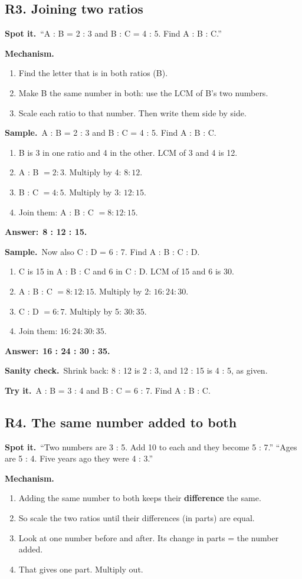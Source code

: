 \documentclass[11pt,a4paper]{article}
\let\oldsubsection\subsection
\renewcommand{\subsection}{\needspace{9\baselineskip}\oldsubsection}
\newcommand{\spot}{\textbf{\color{ember}Spot it.}\ }
\newcommand{\mech}{\textbf{\color{ember}Mechanism.}\ }
\newif\ifkeepsamp
\newcommand{\ans}[1]{\par\nopagebreak\noindent\textbf{\color{ember}Answer:}\ \textbf{#1}\par}
\newcommand{\samp}{\ifkeepsamp\needspace{4\baselineskip}\fi\textbf{\color{ember}Sample.}\ }
\newcommand{\sane}{\textbf{\color{slate}Sanity check.}\ }
\newcommand{\tryit}[1]{\textbf{\color{ember}Try it.}\ #1}
\begin{document}
\subsection{R3. Joining two ratios}
\spot ``A : B = 2 : 3 and B : C = 4 : 5. Find A : B : C.''

\mech
\begin{enumerate}
\item Find the letter that is in both ratios (B).
\item Make B the same number in both: use the LCM of B's two numbers.
\item Scale each ratio to that number. Then write them side by side.
\end{enumerate}

\samp A : B = 2 : 3 and B : C = 4 : 5. Find A : B : C.
\begin{enumerate}
\item B is 3 in one ratio and 4 in the other. LCM of 3 and 4 is 12.
\item A : B $= 2 : 3$. Multiply by 4: $8 : 12$.
\item B : C $= 4 : 5$. Multiply by 3: $12 : 15$.
\item Join them: A : B : C $= 8 : 12 : 15$.
\end{enumerate}
\ans{8 : 12 : 15.}

\samp Now also C : D = 6 : 7. Find A : B : C : D.
\begin{enumerate}
\item C is 15 in A : B : C and 6 in C : D. LCM of 15 and 6 is 30.
\item A : B : C $= 8 : 12 : 15$. Multiply by 2: $16 : 24 : 30$.
\item C : D $= 6 : 7$. Multiply by 5: $30 : 35$.
\item Join them: $16 : 24 : 30 : 35$.
\end{enumerate}
\ans{16 : 24 : 30 : 35.}

\sane Shrink back: 8 : 12 is 2 : 3, and 12 : 15 is 4 : 5, as given.

\tryit A : B = 3 : 4 and B : C = 6 : 7. Find A : B : C.

\subsection{R4. The same number added to both}
\spot ``Two numbers are 3 : 5. Add 10 to each and they become 5 : 7.'' ``Ages are 5 : 4. Five years ago they were 4 : 3.''

\mech
\begin{enumerate}
\item Adding the same number to both keeps their \textbf{difference} the same.
\item So scale the two ratios until their differences (in parts) are equal.
\item Look at one number before and after. Its change in parts = the number added.
\item That gives one part. Multiply out.
\end{enumerate}
\end{document}
